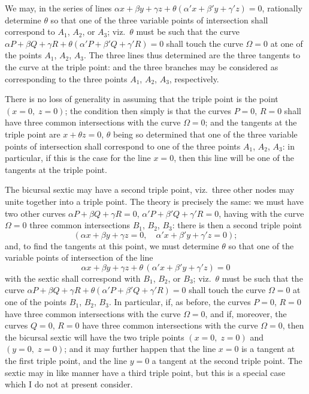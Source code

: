 \documentclass[11pt,a4paper]{book}
\begin{document}
We may, in the series of lines $\alpha x+\beta y+\gamma z + \theta(\alpha' x+\beta' y+\gamma' z)=0$, rationally determine $\theta$ so that one of the three variable points of intersection shall correspond to $A_1$, $A_2$, or $A_3$; viz.\ $\theta$ must be such that the curve $\alpha P+\beta Q+\gamma R+\theta(\alpha' P+\beta' Q+\gamma' R)=0$ shall touch the curve $\Omega=0$ at one of the points $A_1$, $A_2$, $A_3$. The three lines thus determined are the three tangents to the curve at the triple point: and the three branches may be considered as corresponding to the three points $A_1$, $A_2$, $A_3$, respectively.

There is no loss of generality in assuming that the triple point is the point $(x=0,\; z=0)$; the condition then simply is that the curves $P=0$, $R=0$ shall have three common intersections with the curve $\Omega=0$; and the tangents at the triple point are $x+\theta z=0$, $\theta$ being so determined that one of the three variable points of intersection shall correspond to one of the three points $A_1$, $A_2$, $A_3$: in particular, if this is the case for the line $x=0$, then this line will be one of the tangents at the triple point.

\newpage

\noindent
The bicursal sextic may have a second triple point, viz.\ three other nodes may unite together into a triple point. The theory is precisely the same: we must have two other curves $\alpha P+\beta Q+\gamma R=0$, $\alpha' P+\beta' Q+\gamma' R=0$, having with the curve $\Omega=0$ three common intersections $B_1$, $B_2$, $B_3$: there is then a second triple point
\[
(\alpha x + \beta y + \gamma z = 0,\quad \alpha' x + \beta' y + \gamma' z = 0);
\]
and, to find the tangents at this point, we must determine $\theta$ so that one of the variable points of intersection of the line
\[
\alpha x + \beta y + \gamma z + \theta\, (\alpha' x + \beta' y + \gamma' z) = 0
\]
with the sextic shall correspond with $B_1$, $B_2$, or $B_3$; viz.\ $\theta$ must be such that the curve $\alpha P+\beta Q+\gamma R+\theta(\alpha' P+\beta' Q+\gamma' R)=0$ shall touch the curve $\Omega=0$ at one of the points $B_1$, $B_2$, $B_3$. In particular, if, as before, the curves $P=0$, $R=0$ have three common intersections with the curve $\Omega=0$, and if, moreover, the curves $Q=0$, $R=0$ have three common intersections with the curve $\Omega=0$, then the bicursal sextic will have the two triple points $(x=0,\; z=0)$ and $(y=0,\; z=0)$; and it may further happen that the line $x=0$ is a tangent at the first triple point, and the line $y=0$ a tangent at the second triple point. The sextic may in like manner have a third triple point, but this is a special case which I do not at present consider.
\end{document}
